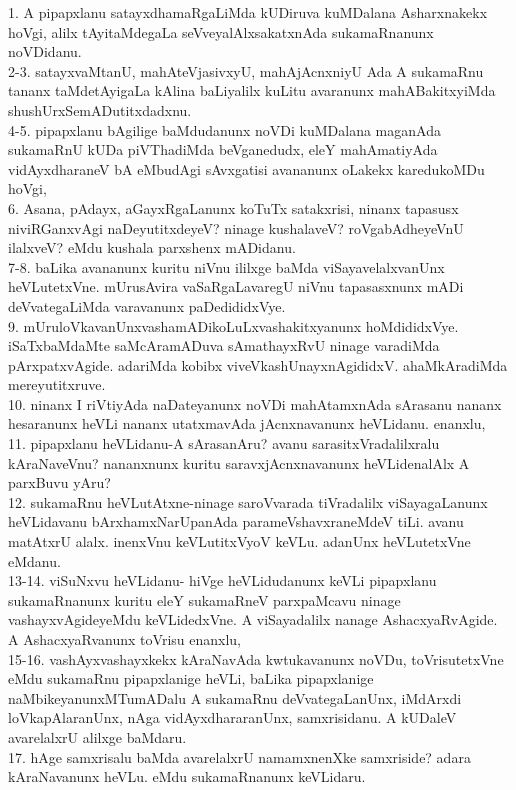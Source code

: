 \documentclass{article}
\begin{document}
1. A pipapxlanu satayxdhamaRgaLiMda kUDiruva kuMDalana Asharxnakekx hoVgi, alilx tAyitaMdegaLa seVveyalAlxsakatxnAda sukamaRnanunx noVDidanu.\\
2-3. satayxvaMtanU, mahAteVjasivxyU, mahAjAcnxniyU Ada A sukamaRnu tananx taMdetAyigaLa kAlina baLiyalilx kuLitu avaranunx mahABakitxyiMda shushUrxSemADutitxdadxnu.\\
4-5. pipapxlanu bAgilige baMdudanunx noVDi kuMDalana maganAda sukamaRnU kUDa piVThadiMda beVganedudx, eleY mahAmatiyAda vidAyxdharaneV bA eMbudAgi sAvxgatisi avananunx oLakekx karedukoMDu hoVgi,\\
6. Asana, pAdayx, aGayxRgaLanunx koTuTx satakxrisi, ninanx tapasusx niviRGanxvAgi naDeyutitxdeyeV? ninage kushalaveV? roVgabAdheyeVnU ilalxveV? eMdu kushala parxshenx mADidanu.\\
7-8. baLika avananunx kuritu niVnu ililxge baMda viSayavelalxvanUnx heVLutetxVne. mUrusAvira vaSaRgaLavaregU niVnu tapasasxnunx mADi deVvategaLiMda varavanunx paDedididxVye.\\
9. mUruloVkavanUnxvashamADikoLuLxvashakitxyanunx hoMdididxVye. iSaTxbaMdaMte saMcAramADuva sAmathayxRvU ninage varadiMda pArxpatxvAgide. adariMda kobibx viveVkashUnayxnAgididxV. ahaMkAradiMda mereyutitxruve.\\
10. ninanx I riVtiyAda naDateyanunx noVDi mahAtamxnAda sArasanu nananx hesaranunx heVLi nananx utatxmavAda jAcnxnavanunx heVLidanu. enanxlu,\\
11. pipapxlanu heVLidanu-A sArasanAru? avanu sarasitxVradalilxralu kAraNaveVnu? nananxnunx kuritu saravxjAcnxnavanunx heVLidenalAlx A parxBuvu yAru?\\
12. sukamaRnu heVLutAtxne-ninage saroVvarada tiVradalilx viSayagaLanunx heVLidavanu bArxhamxNarUpanAda parameVshavxraneMdeV tiLi. avanu matAtxrU alalx. inenxVnu keVLutitxVyoV keVLu. adanUnx heVLutetxVne eMdanu.\\
13-14. viSuNxvu heVLidanu- hiVge heVLidudanunx keVLi pipapxlanu sukamaRnanunx kuritu eleY sukamaRneV parxpaMcavu ninage vashayxvAgideyeMdu keVLidedxVne. A viSayadalilx nanage AshacxyaRvAgide. A AshacxyaRvanunx toVrisu enanxlu,\\
15-16. vashAyxvashayxkekx kAraNavAda kwtukavanunx noVDu, toVrisutetxVne eMdu sukamaRnu pipapxlanige heVLi, baLika pipapxlanige naMbikeyanunxMTumADalu A sukamaRnu deVvategaLanUnx, iMdArxdi loVkapAlaranUnx, nAga vidAyxdhararanUnx, samxrisidanu. A kUDaleV avarelalxrU alilxge baMdaru.\\
17. hAge samxrisalu baMda avarelalxrU namamxnenXke samxriside? adara kAraNavanunx heVLu. eMdu sukamaRnanunx keVLidaru.\\
\end{document}
